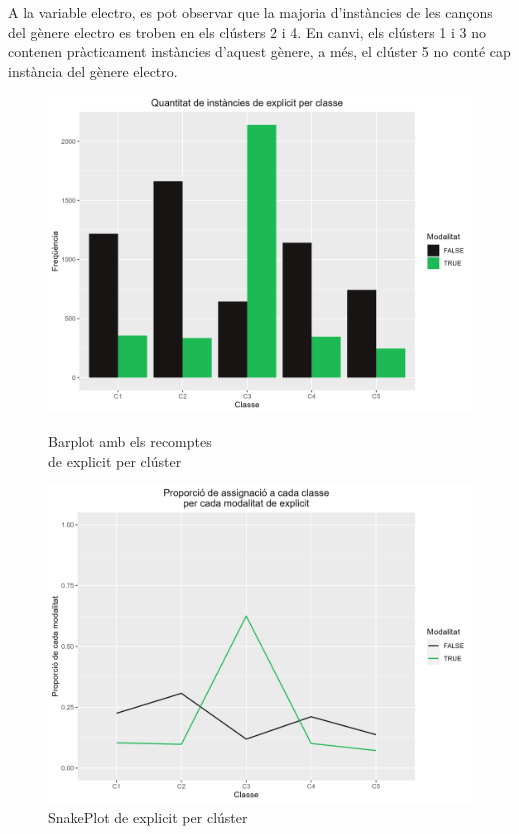 A la variable electro, es pot observar que la majoria d'instàncies de les cançons del gènere electro es troben en els clústers 2 i 4. En canvi, els clústers 1 i 3 no contenen pràcticament instàncies d'aquest gènere, a més, el clúster 5 no conté cap instància del gènere electro.

\begin{figure}[H]
\centering
    \begin{minipage}{.49\textwidth}
        \centering
        \includegraphics[width=0.95\linewidth]{Images/5_Profiling/categoriques/cat/Cat_BarPlot_explicit.png}
        \caption{Barplot amb els recomptes \\ de explicit per clúster}
        \label{fig:Cat_BarPlot_explicit}
    \end{minipage}%
    \begin{minipage}{.49\textwidth}
        \centering
        \includegraphics[width=0.95\linewidth]{Images/5_Profiling/categoriques/cat/Cat_SnakePlot_explicit.png}
        \caption{SnakePlot de explicit per clúster}
        \label{fig:Cat_SnakePlot_explicit}
    \end{minipage}%
\end{figure}

